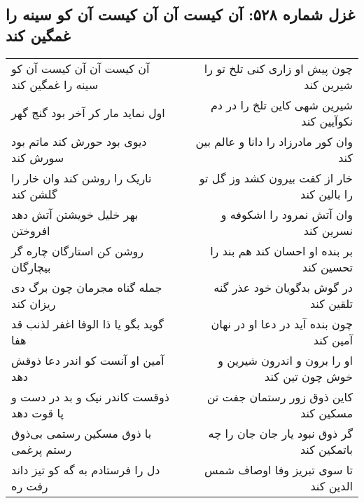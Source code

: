 \begin{center}
\section*{غزل شماره ۵۲۸: آن کیست آن آن کیست آن کو سینه را غمگین کند}
\label{sec:0528}
\begin{longtable}{l p{0.5cm} r}
آن کیست آن آن کیست آن کو سینه را غمگین کند
&&
چون پیش او زاری کنی تلخ تو را شیرین کند
\\
اول نماید مار کر آخر بود گنج گهر
&&
شیرین شهی کاین تلخ را در دم نکوآیین کند
\\
دیوی بود حورش کند ماتم بود سورش کند
&&
وان کور مادرزاد را دانا و عالم بین کند
\\
تاریک را روشن کند وان خار را گلشن کند
&&
خار از کفت بیرون کشد وز گل تو را بالین کند
\\
بهر خلیل خویشتن آتش دهد افروختن
&&
وان آتش نمرود را اشکوفه و نسرین کند
\\
روشن کن استارگان چاره گر بیچارگان
&&
بر بنده او احسان کند هم بند را تحسین کند
\\
جمله گناه مجرمان چون برگ دی ریزان کند
&&
در گوش بدگویان خود عذر گنه تلقین کند
\\
گوید بگو یا ذا الوفا اغفر لذنب قد هفا
&&
چون بنده آید در دعا او در نهان آمین کند
\\
آمین او آنست کو اندر دعا ذوقش دهد
&&
او را برون و اندرون شیرین و خوش چون تین کند
\\
ذوقست کاندر نیک و بد در دست و پا قوت دهد
&&
کاین ذوق زور رستمان جفت تن مسکین کند
\\
با ذوق مسکین رستمی بی‌ذوق رستم پرغمی
&&
گر ذوق نبود یار جان جان را چه باتمکین کند
\\
دل را فرستادم به گه کو تیز داند رفت ره
&&
تا سوی تبریز وفا اوصاف شمس الدین کند
\\
\end{longtable}
\end{center}
